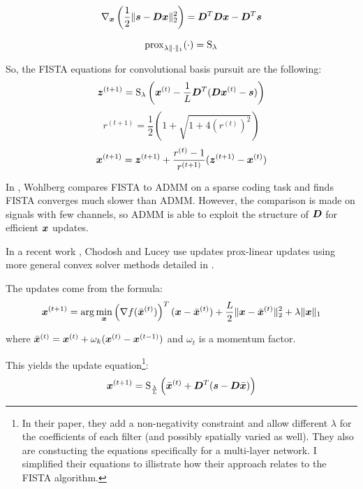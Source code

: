 \begin{equation}
\nabla_{\bm{x}}\left(\frac{1}{2}\|\bm{s} - \bm{D}\bm{x}\|_2^2\right) = \bm{D}^T\bm{D}\bm{x} - \bm{D}^T\bm{s}
\end{equation}

\begin{equation}
\operatorname{prox}_{\lambda\|\cdot\|_1}(\cdot) = \operatorname{S}_{\lambda}
\end{equation}

So, the FISTA equations for convolutional basis pursuit are the following:
\begin{equation}
\bm{z}^{(t + 1)} = \operatorname{S}_{\lambda}\left(\bm{x}^{(t)} - \frac{1}{L}\bm{D}^T(\bm{D}\bm{x}^{(t)} - \bm{s})\right)
\end{equation}
\begin{equation}
r^{(t + 1)} = \frac{1}{2}\left(1 + \sqrt{1 + 4(r^{(t)})^2}\right)
\end{equation}
\begin{equation}
\bm{x}^{(t + 1)} = \bm{z}^{(t + 1)} + \frac{r^{(t)} - 1}{r^{(t + 1)}}(\bm{z}^{(t + 1)} - \bm{x}^{(t)})
\end{equation}

In \cite{wohlberg2015efficient}, Wohlberg compares FISTA to ADMM on a sparse coding task and finds FISTA converges much slower than ADMM. However, the comparison is made on signals with few channels, so ADMM is able to exploit the structure of $\bm{D}$ for efficient $\bm{x}$ updates.

In a recent work \cite{chodosh2020use}, Chodosh and Lucey use updates prox-linear updates using more general convex solver methods detailed in \cite{xu2013block}.

The updates come from the formula:
\begin{equation}
\bm{x}^{(t + 1)} = \arg\min_{\bm{x}} \left(\nabla f(\bar{\bm{x}}^{(t)})\right)^T(\bm{x} - \bar{\bm{x}}^{(t)}) + \frac{L}{2}\|\bm{x} - \bar{\bm{x}}^{(t)}\|_2^2 + \lambda\|\bm{x}\|_1
\end{equation}

where $\bar{\bm{x}}^{(t)} = \bm{x}^{(t)} + \omega_k(\bm{x}^{(t)} - \bm{x}^{(t - 1)})$ and $\omega_t$ is a momentum factor.

This yields the update equation\footnote{In their paper, they add a non-negativity constraint and allow different $\lambda$ for the coefficients of each filter (and possibly spatially varied as well). They also are constucting the equations specifically for a multi-layer network. I simplified their equations to illistrate how their approach relates to the FISTA algorithm.}:
\begin{equation}
\bm{x}^{(t + 1)} = \operatorname{S}_{\frac{\lambda}{L}}\left(\bar{\bm{x}}^{(t)} + \bm{D}^T(\bm{s} - \bm{D}\bar{\bm{x}})\right)
\end{equation}

